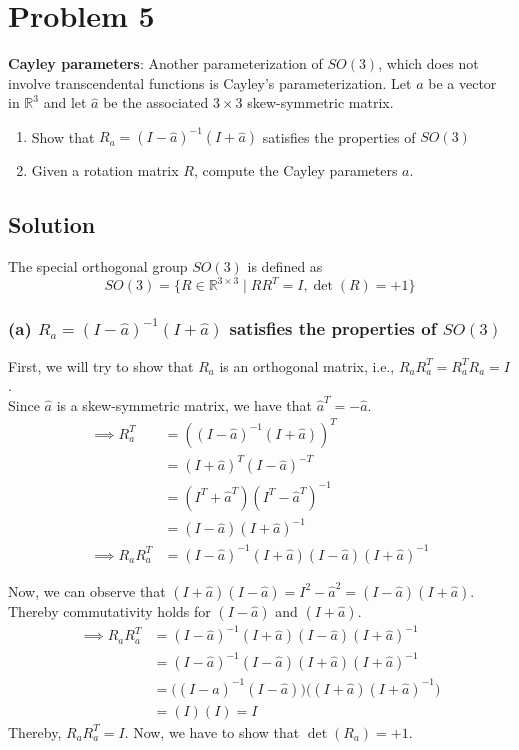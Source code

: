 \section*{Problem 5}

\textbf{Cayley parameters}:
Another parameterization of \(S O(3)\), which does not involve transcendental functions is Cayley's parameterization.
Let \(a\) be a vector in \(\mathbb{R}^{3}\) and let \(\hat{a}\) be the associated \(3 \times 3\) skew-symmetric matrix.
\begin{enumerate}[label= (\alph*)]
    \item Show that \(R_{a}=(I-\hat{a})^{-1}(I+\hat{a})\) satisfies the properties of \(S O(3)\)
    \item Given a rotation matrix \(R\), compute the Cayley parameters \(a\).
\end{enumerate}

\subsection*{Solution}

The special orthogonal group \( SO(3) \) is defined as
\[
    SO(3) = \{ R \in \mathbb{R}^{3 \times 3} \mid R R^{T} = I, \det(R) = +1 \}
\]

\subsubsection*{(a) \( R_{a}=(I-\hat{a})^{-1}(I+\hat{a}) \) satisfies the properties of \( SO(3) \)}

First, we will try to show that \( R_{a} \) is an orthogonal matrix, i.e., \( R_{a} R_{a}^{T} = R_{a}^{T} R_{a} = I \).\\
Since \( \hat a \) is a skew-symmetric matrix, we have that \( \hat a^{T} = -\hat a \).
\begin{align*}
    \implies
    R_a^T
     & =
    \left( (I - \hat{a})^{-1} (I + \hat{a}) \right)^T
    \\ & =
    (I + \hat{a})^T (I - \hat{a})^{-T}
    \\ & =
    (I^T + \hat{a}^T) (I^T - \hat{a}^T)^{-1}
    \\ & =
    (I - \hat{a}) (I + \hat{a})^{-1}
    \\
    \implies
    R_a R_a^T
     & =
    (I - \hat{a})^{-1} (I + \hat{a}) (I - \hat{a}) (I + \hat{a})^{-1}
\end{align*}

Now, we can observe that \( (I + \hat{a}) (I - \hat{a}) = I^2 - \hat{a}^2 = (I - \hat{a}) (I + \hat{a}) \).\\
Thereby commutativity holds for \( (I - \hat{a}) \) and \( (I + \hat{a}) \).
\begin{align*}
    \implies
    R_a R_a^T
     & =
    (I - \hat{a})^{-1} (I + \hat{a}) (I - \hat{a}) (I + \hat{a})^{-1}
    \\ & =
    (I - \hat{a})^{-1} (I - \hat{a}) (I + \hat{a}) (I + \hat{a})^{-1}
    \\ & =
    \Big((I - \hat{a})^{-1} (I - \hat{a}) \Big) \Big( (I + \hat{a}) (I + \hat{a})^{-1} \Big)
    \\ & =
    (I)(I)
    = I
\end{align*}
Thereby, \( R_a R_a^T = I \).
Now, we have to show that \( \det(R_a) = +1 \).
